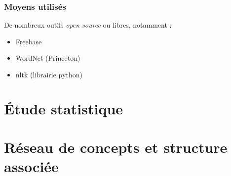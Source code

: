 \documentclass{beamer}
\begin{document}
\begin{frame}
\frametitle{Moyens utilisés}

De nombreux outils \textit{open source} ou libres, notamment :
\begin{itemize}
 \item Freebase
 \item WordNet (Princeton)
 \item nltk (librairie python)
\end{itemize}


\end{frame}

\section{Étude statistique}%

\section{Réseau de concepts et structure associée}%
	

	
\end{document}
